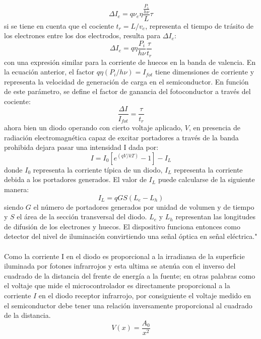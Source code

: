 \documentclass[12]{article}
\begin{document}
\begin{multicols}{2}
\begin{equation}
\Delta I_{e} = q\nu_{e}\eta\frac{\frac{P_{i}}{h\nu}}{L}\tau
\end{equation}
si se tiene en cuenta que el cociente $t_{r} = L/v_{e}$, representa el tiempo de trásito de los electrones entre los dos electrodos, resulta para $\Delta I_{e}$:
\begin{equation}
\Delta I_{e} = q\eta \frac{P_{i}}{h\nu}\frac{\tau}{t_{r}}
\end{equation}
con una expresión similar para la corriente de huecos en la banda de valencia. En la ecuación anterior, el factor $q\eta(P_{i}/h\nu) = I_{fot}$ tiene dimensiones de corriente y representa la velocidad de generación de carga en el semiconductor. En función de este parámetro, se define el factor de ganancia del fotoconductor a través del cociente:
\begin{equation}
\frac{\Delta I}{I_{fot}} = \frac{\tau}{t_{r}}
\end{equation}
ahora bien un diodo operando con cierto voltaje aplicado, $V$, en presencia de radiación electromagnética  capaz de excitar portadores a través de la banda prohibida dejara pasar una intensidad I dada por:
\begin{equation}
I = I_{0}[e^{(qV/kT)}-1] - I_{L}
\end{equation}
donde $I_{0}$ representa la corriente típica de un diodo, $I_{L}$ representa la corriente debida a  los portadores generados. El valor de $I_{L}$ puede calcularse de la siguiente manera:
\begin{equation}
I_{L} = qGS(L_{e} - L_{h})
\end{equation}
siendo $G$ el número de portadores generados por unidad de volumen y de tiempo y $S$ el área de la sección transversal del diodo. $L_{e}$ y $L_{h}$ representan las longitudes de difusión de los electrones y huecos. El dispositivo funciona entonces como detector del nivel de iluminación  convirtiendo una señal óptica en señal eléctrica." \cite{FOTOELECTRICO}\\ \\ 
Como la corriente I en el diodo es proporcional a la irradiansa de la superficie iluminada por fotones infrarrojos y esta ultima se atenúa con el inverso del cuadrado de la distancia del frente de energía a la fuente; en otras palabras como el voltaje que mide el microcontrolador es directamente proporcional a la corriente $I$ en el diodo receptor infrarrojo, por consiguiente el voltaje medido en el semiconductor debe  tener una relación inversamente proporcional al cuadrado de la distancia.
\begin{equation}
V(x) = \frac{A_{0}}{x^{2}}
\end{equation}

\end{multicols}
\end{document}
